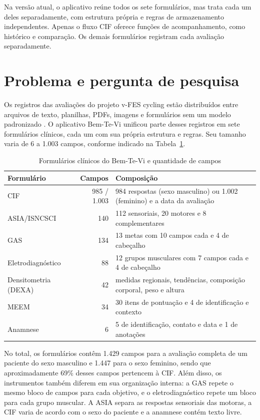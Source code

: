Na versão atual, o aplicativo reúne todos os sete formulários, mas trata cada um deles separadamente, com estrutura própria e
regras de armazenamento independentes. Apenas o fluxo CIF oferece funções de acompanhamento, como histórico
e comparação. Os demais formulários registram cada avaliação separadamente.



\section{Problema e pergunta de pesquisa}
\label{sec:problema}

Os registros das avaliações do projeto v-FES cycling estão distribuídos entre arquivos de texto, planilhas, PDFs,
imagens e formulários sem um modelo padronizado \cite{ochoadiaz2026plano}. O aplicativo Bem-Te-Vi unificou parte desses registros em sete formulários clínicos,
cada um com sua própria estrutura e regras. Seu tamanho varia de
6 a 1.003 campos, conforme indicado na Tabela~\ref{tab:formularios}.

\begin{table}[htb]
	\centering
	\caption{Formulários clínicos do Bem-Te-Vi e quantidade de campos}
	\label{tab:formularios}
	\small
	\begin{tabular}{lrp{}}
		\toprule
		Formulário & Campos & Composição \\
		\midrule
		CIF & 985 / 1.003 & 984 respostas (sexo masculino) ou 1.002 (feminino) e a data da avaliação \\
		ASIA/ISNCSCI & 140 & 112 sensoriais, 20 motores e 8 complementares \\
		GAS & 134 & 13 metas com 10 campos cada e 4 de cabeçalho \\
		Eletrodiagnóstico & 88 & 12 grupos musculares com 7 campos cada e 4 de cabeçalho \\
		Densitometria (DEXA) & 42 & medidas regionais, tendências, composição corporal, peso e altura \\
		MEEM & 34 & 30 itens de pontuação e 4 de identificação e contexto \\
		Anamnese & 6 & 5 de identificação, contato e data e 1 de anotações \\
		\bottomrule
	\end{tabular}
\end{table}
  
No total, os formulários contêm 1.429 campos para a avaliação completa
de um paciente do sexo masculino e 1.447 para o sexo feminino, sendo que aproximadamente 69\% desses campos
pertencem à CIF. Além disso, os instrumentos também diferem em sua organização interna: a GAS repete
o mesmo bloco de campos para cada objetivo, e o eletrodiagnóstico repete um bloco para cada
grupo muscular. A ASIA separa as respostas sensoriais das motoras, a CIF varia de acordo com o sexo
do paciente e a anamnese contém texto livre.
  
